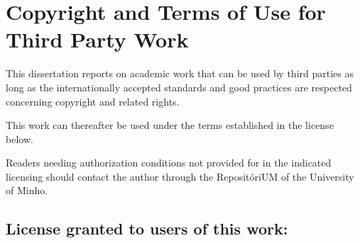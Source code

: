 \chapter*{Copyright and Terms of Use for Third Party Work}
\setlength{\parskip}{1em}
\noindent
This dissertation reports on academic work that can be used by third parties as long as the internationally accepted standards and good practices are respected concerning copyright and related rights.

\noindent
This work can thereafter be used under the terms established in the license below.

\noindent
Readers needing authorization conditions not provided for in the indicated licensing should contact the author through the RepositóriUM of the University of Minho.

\section*{License granted to users of this work:}





